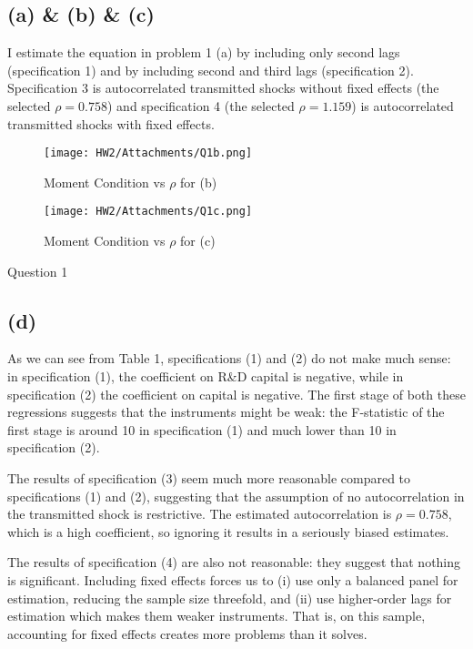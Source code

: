 \subsection{(a) & (b) & (c)}

I estimate the equation in problem 1 (a) by including only second lags (specification 1) and by including second and third lags (specification 2). Specification 3 is autocorrelated transmitted shocks without fixed effects (the selected $\rho=0.758$) and specification 4 (the selected $\rho=1.159$) is autocorrelated transmitted shocks with fixed effects.


\begin{figure}[h!]
    \centering
    \texttt{[image: HW2/Attachments/Q1b.png]}
    \caption{Moment Condition vs $\rho$ for (b)}
    \label{fig:my_label}
\end{figure}

\begin{figure}[h!]
    \centering
    \texttt{[image: HW2/Attachments/Q1c.png]}
    \caption{Moment Condition vs $\rho$ for (c)}
    \label{fig:my_label}
\end{figure}

\begin{table}[h!]
    \centering
    \footnotesize{
    
    }
    \caption{Question 1}
    \label{tab:my_label}
\end{table}

\subsection{(d)}

As we can see from Table 1, specifications (1) and (2) do not make much sense: in specification (1), the coefficient on R\&D capital is negative, while in specification (2) the coefficient on capital is negative. The first stage of both these regressions suggests that the instruments might be weak: the F-statistic of the first stage is around 10 in specification (1) and much lower than 10 in specification (2).

The results of specification (3) seem much more reasonable compared to specifications (1) and (2), suggesting that the assumption of no autocorrelation in the transmitted shock is restrictive. The estimated autocorrelation is $\rho=0.758$, which is a high coefficient, so ignoring it results in a seriously biased estimates.

The results of specification (4) are also not reasonable: they suggest that nothing is significant. Including fixed effects forces us to (i) use only a balanced panel for estimation, reducing the sample size threefold, and (ii) use higher-order lags for estimation which makes them weaker instruments. That is, on this sample, accounting for fixed effects creates more problems than it solves.
